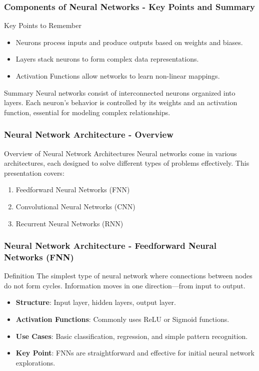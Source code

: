 \documentclass[aspectratio=169]{beamer}
\begin{document}
\begin{frame}[fragile]
    \frametitle{Components of Neural Networks - Key Points and Summary}
    \begin{block}{Key Points to Remember}
        \begin{itemize}
            \item Neurons process inputs and produce outputs based on weights and biases.
            \item Layers stack neurons to form complex data representations.
            \item Activation Functions allow networks to learn non-linear mappings.
        \end{itemize}
    \end{block}

    \begin{block}{Summary}
        Neural networks consist of interconnected neurons organized into layers. Each neuron's behavior is controlled by its weights and an activation function, essential for modeling complex relationships.
    \end{block}
\end{frame}

\begin{frame}[fragile]
    \frametitle{Neural Network Architecture - Overview}
    \begin{block}{Overview of Neural Network Architectures}
        Neural networks come in various architectures, each designed to solve different types of problems effectively. This presentation covers:
        \begin{enumerate}
            \item Feedforward Neural Networks (FNN)
            \item Convolutional Neural Networks (CNN)
            \item Recurrent Neural Networks (RNN)
        \end{enumerate}
    \end{block}
\end{frame}

\begin{frame}[fragile]
    \frametitle{Neural Network Architecture - Feedforward Neural Networks (FNN)}
    \begin{block}{Definition}
        The simplest type of neural network where connections between nodes do not form cycles. Information moves in one direction—from input to output.
    \end{block}
    \begin{itemize}
        \item \textbf{Structure}: Input layer, hidden layers, output layer.
        \item \textbf{Activation Functions}: Commonly uses ReLU or Sigmoid functions.
        \item \textbf{Use Cases}: Basic classification, regression, and simple pattern recognition.
        \item \textbf{Key Point}: FNNs are straightforward and effective for initial neural network explorations.
    \end{itemize}
\end{frame}
\end{document}
